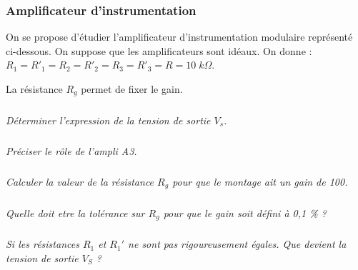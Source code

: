 \documentclass[10pt]{article}
\begin{document}
\subsubsection*{Amplificateur d'instrumentation}
On se propose d'étudier l'amplificateur d'instrumentation modulaire représenté ci-dessous. On suppose que les amplificateurs sont idéaux. On donne : $R_1 = R'_1 = R_2 = R'_2 = R_3 = R'_3=R = 10\; k\Omega$. 

La résistance $R_g$ permet de fixer le gain. 
\subparagraph{}
\textit{Déterminer l'expression de la tension de sortie $V_s$. }
\subparagraph{}
\textit{Préciser le rôle de l'ampli A3.}
\subparagraph{}
\textit{Calculer la valeur de la résistance $R_g$ pour que le montage ait un gain de 100.}
\subparagraph{}
\textit{Quelle doit etre la tolérance sur $R_g$ pour que le gain soit défini à 0,1 \% ? }
\subparagraph{}
\textit{Si les résistances $R_1$ et $R_1'$ ne sont pas rigoureusement égales. Que devient la tension de sortie $V_S$ ?}
\subparagraph{}
\textit{}
\end{document}
